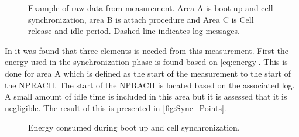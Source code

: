 \begin{figure}[H]
\centering
\begin{minipage}[tbp]{0.58\textwidth}
\resizebox{\textwidth}{!}{
}
\end{minipage}%
\begin{minipage}[tbp]{0.39\textwidth}
\end{minipage}
\caption{Example of raw data from measurement. Area A is boot up and cell synchronization, area B is attach procedure and Area C is Cell release and idle period. Dashed line indicates log messages.}
\label{fig:Attach_raw}
\end{figure}

In  it was found that three elements is needed from this measurement. First the energy used in the synchronization phase is found based on \autoref{eq:energy}. This is done for area A which is defined as the start of the measurement to the start of the NPRACH. The start of the NPRACH is located based on the associated log. A small amount of idle time is included in this area but it is assessed that it is negligible. The result of this is presented in \autoref{fig:Sync_Points}. 



\begin{figure}[H]
\centering
\begin{minipage}{0.48\textwidth}
\resizebox{\textwidth}{!}{
}
\end{minipage}
\hfill
\begin{minipage}{0.48\textwidth}
\resizebox{\textwidth}{!}{
}
\end{minipage}
\caption{Energy consumed during boot up and cell synchronization.}
\label{fig:Sync_Points}
\end{figure}

